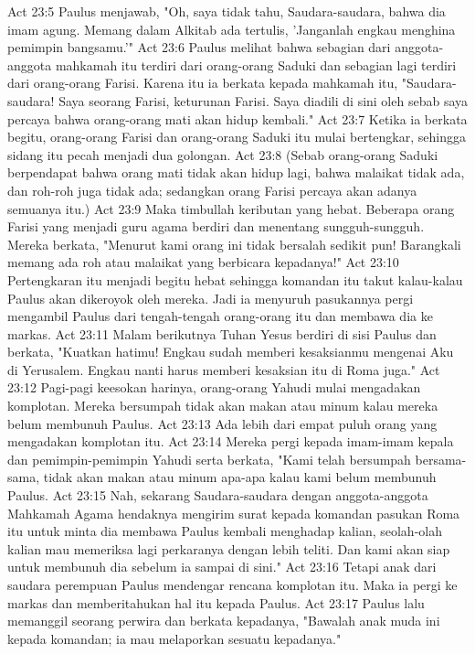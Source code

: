 Act 23:5  Paulus menjawab, "Oh, saya tidak tahu, Saudara-saudara, bahwa dia imam agung. Memang dalam Alkitab ada tertulis, 'Janganlah engkau menghina pemimpin bangsamu.'"
Act 23:6  Paulus melihat bahwa sebagian dari anggota-anggota mahkamah itu terdiri dari orang-orang Saduki dan sebagian lagi terdiri dari orang-orang Farisi. Karena itu ia berkata kepada mahkamah itu, "Saudara-saudara! Saya seorang Farisi, keturunan Farisi. Saya diadili di sini oleh sebab saya percaya bahwa orang-orang mati akan hidup kembali."
Act 23:7  Ketika ia berkata begitu, orang-orang Farisi dan orang-orang Saduki itu mulai bertengkar, sehingga sidang itu pecah menjadi dua golongan.
Act 23:8  (Sebab orang-orang Saduki berpendapat bahwa orang mati tidak akan hidup lagi, bahwa malaikat tidak ada, dan roh-roh juga tidak ada; sedangkan orang Farisi percaya akan adanya semuanya itu.)
Act 23:9  Maka timbullah keributan yang hebat. Beberapa orang Farisi yang menjadi guru agama berdiri dan menentang sungguh-sungguh. Mereka berkata, "Menurut kami orang ini tidak bersalah sedikit pun! Barangkali memang ada roh atau malaikat yang berbicara kepadanya!"
Act 23:10  Pertengkaran itu menjadi begitu hebat sehingga komandan itu takut kalau-kalau Paulus akan dikeroyok oleh mereka. Jadi ia menyuruh pasukannya pergi mengambil Paulus dari tengah-tengah orang-orang itu dan membawa dia ke markas.
Act 23:11  Malam berikutnya Tuhan Yesus berdiri di sisi Paulus dan berkata, "Kuatkan hatimu! Engkau sudah memberi kesaksianmu mengenai Aku di Yerusalem. Engkau nanti harus memberi kesaksian itu di Roma juga."
Act 23:12  Pagi-pagi keesokan harinya, orang-orang Yahudi mulai mengadakan komplotan. Mereka bersumpah tidak akan makan atau minum kalau mereka belum membunuh Paulus.
Act 23:13  Ada lebih dari empat puluh orang yang mengadakan komplotan itu.
Act 23:14  Mereka pergi kepada imam-imam kepala dan pemimpin-pemimpin Yahudi serta berkata, "Kami telah bersumpah bersama-sama, tidak akan makan atau minum apa-apa kalau kami belum membunuh Paulus.
Act 23:15  Nah, sekarang Saudara-saudara dengan anggota-anggota Mahkamah Agama hendaknya mengirim surat kepada komandan pasukan Roma itu untuk minta dia membawa Paulus kembali menghadap kalian, seolah-olah kalian mau memeriksa lagi perkaranya dengan lebih teliti. Dan kami akan siap untuk membunuh dia sebelum ia sampai di sini."
Act 23:16  Tetapi anak dari saudara perempuan Paulus mendengar rencana komplotan itu. Maka ia pergi ke markas dan memberitahukan hal itu kepada Paulus.
Act 23:17  Paulus lalu memanggil seorang perwira dan berkata kepadanya, "Bawalah anak muda ini kepada komandan; ia mau melaporkan sesuatu kepadanya."
